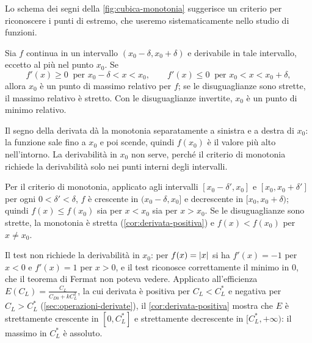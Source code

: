 Lo schema dei segni della \cref{fig:cubica-monotonia} suggerisce un criterio per
riconoscere i punti di estremo, che useremo sistematicamente nello studio di funzioni.

\begin{corollario}\label{cor:test-derivata-prima}
Sia $f$ continua in un intervallo $(x_{0}-\delta,x_{0}+\delta)$ e derivabile in tale
intervallo, eccetto al più nel punto $x_{0}$. Se
\begin{equation}\label{eq:test-derivata-prima}
  f'(x)\ge0 \ \text{ per } x_{0}-\delta<x<x_{0}, \qquad
  f'(x)\le0 \ \text{ per } x_{0}<x<x_{0}+\delta,
\end{equation}
allora $x_{0}$ è un punto di massimo relativo per $f$; se le disuguaglianze sono strette,
il massimo relativo è stretto. Con le disuguaglianze invertite, $x_{0}$ è un punto di
minimo relativo.
\end{corollario}

\begin{schema}
\end{schema}

\begin{strategia}
Il segno della derivata dà la monotonia separatamente a sinistra e a destra di $x_{0}$:
la funzione sale fino a $x_{0}$ e poi scende, quindi $f(x_{0})$ è il valore più alto
nell'intorno. La derivabilità in $x_{0}$ non serve, perché il criterio di monotonia
richiede la derivabilità solo nei punti interni degli intervalli.
\end{strategia}

\begin{dimostrazione}
Per il criterio di monotonia, applicato agli intervalli $[x_{0}-\delta',x_{0}]$ e
$[x_{0},x_{0}+\delta']$ per ogni $0<\delta'<\delta$, $f$ è crescente in
$(x_{0}-\delta,x_{0}]$ e decrescente in $[x_{0},x_{0}+\delta)$; quindi $f(x)\le f(x_{0})$
sia per $x<x_{0}$ sia per $x>x_{0}$. Se le disuguaglianze sono strette, la monotonia è
stretta (\cref{cor:derivata-positiva}) e $f(x)<f(x_{0})$ per $x\neq x_{0}$.
\end{dimostrazione}

Il test non richiede la derivabilità in $x_{0}$: per $f(x)=\lvert x\rvert$ si ha $f'(x)=-1$ per
$x<0$ e $f'(x)=1$ per $x>0$, e il test riconosce correttamente il minimo in $0$, che il
teorema di Fermat non poteva vedere. Applicato all'efficienza
$E(C_{L})=\frac{C_{L}}{C_{D0}+kC_{L}^{2}}$, la cui derivata è positiva per
$C_{L}<C_{L}^{*}$ e negativa per $C_{L}>C_{L}^{*}$ (\cref{sec:operazioni-derivate}), il
\cref{cor:derivata-positiva} mostra che $E$ è strettamente crescente in $[0,C_{L}^{*}]$ e
strettamente decrescente in $[C_{L}^{*},+\infty)$: il massimo in $C_{L}^{*}$ è assoluto.
